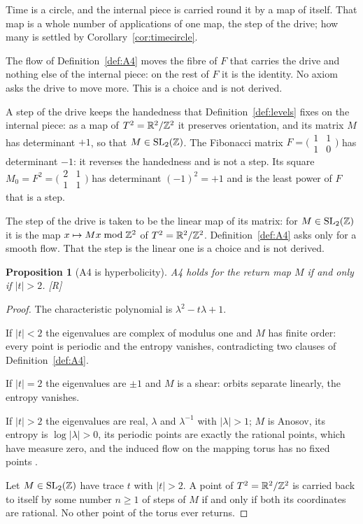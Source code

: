 \documentclass[11pt,a4paper]{article}
\theoremstyle{plain}
\newtheorem{proposition}[theorem]{Proposition}
\theoremstyle{definition}
\theoremstyle{remark}
\newcommand{\rigR}{[\textup{R}]}
\begin{document}
Time is a circle, and the internal piece is carried round it by a map of itself. That map is a whole number of applications of one map, the step of the drive; how many is settled by Corollary~\ref{cor:timecircle}.

The flow of Definition~\ref{def:A4} moves the fibre of $F$ that carries the drive and nothing else of the internal piece: on the rest of $F$ it is the identity. No axiom asks the drive to move more. This is a choice and is not derived.

A step of the drive keeps the handedness that Definition~\ref{def:levels} fixes on the internal piece: as a map of $T^2=\mathbb{R}^{2}/\mathbb{Z}^{2}$ it preserves orientation, and its matrix $M$ has determinant $+1$, so that $M\in\mathrm{SL}_{2}(\mathbb{Z})$. The Fibonacci matrix $F=\bigl(\begin{smallmatrix}1&1\\1&0\end{smallmatrix}\bigr)$ has determinant $-1$: it reverses the handedness and is not a step. Its square $M_{0}=F^{2}=\bigl(\begin{smallmatrix}2&1\\1&1\end{smallmatrix}\bigr)$ has determinant $(-1)^{2}=+1$ and is the least power of $F$ that is a step.

The step of the drive is taken to be the linear map of its matrix: for $M\in\mathrm{SL}_{2}(\mathbb{Z})$ it is the map $x\mapsto Mx \bmod \mathbb{Z}^{2}$ of $T^2=\mathbb{R}^{2}/\mathbb{Z}^{2}$. Definition~\ref{def:A4} asks only for a smooth flow. That the step is the linear one is a choice and is not derived.

\begin{proposition}[A4 is hyperbolicity]\label{prop:hyp}
A4 holds for the return map $M$ if and only if $\lvert t\rvert>2$. \rigR
\end{proposition}

\begin{proof}
The characteristic polynomial is $\lambda^{2}-t\lambda+1$.

If $\lvert t\rvert<2$ the eigenvalues are complex of modulus one and $M$ has finite order: every point is periodic and the entropy vanishes, contradicting two clauses of Definition~\ref{def:A4}.

If $\lvert t\rvert=2$ the eigenvalues are $\pm1$ and $M$ is a shear: orbits separate linearly, the entropy vanishes.

If $\lvert t\rvert>2$ the eigenvalues are real, $\lambda$ and $\lambda^{-1}$ with $\lvert\lambda\rvert>1$; $M$ is Anosov, its entropy is $\log\lvert\lambda\rvert>0$, its periodic points are exactly the rational points, which have measure zero, and the induced flow on the mapping torus has no fixed points \cite{KatokHasselblatt}.

Let $M\in\mathrm{SL}_{2}(\mathbb{Z})$ have trace $t$ with $\lvert t\rvert>2$. A point of $T^2=\mathbb{R}^{2}/\mathbb{Z}^{2}$ is carried back to itself by some number $n\ge1$ of steps of $M$ if and only if both its coordinates are rational. No other point of the torus ever returns.
\end{proof}
\end{document}
